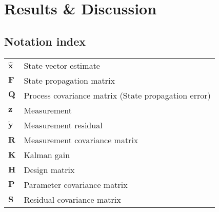 \documentclass[12pt]{article}
\begin{document}
\section{Results \& Discussion}

\newpage
\begin{appendices}

\section{Notation index}
\begin{tabular}{ll}
$\hat{\mathbf{x}}$   & State vector estimate \\
$\mathbf{F}$         & State propagation matrix \\
$\mathbf{Q}$         & Process covariance matrix (State propagation error) \\
$\mathbf{z}$         & Measurement \\
$\tilde{\mathbf{y}}$ & Measurement residual \\
$\mathbf{R}$         & Measurement covariance matrix \\
$\mathbf{K}$         & Kalman gain \\
$\mathbf{H}$         & Design matrix \\
$\mathbf{P}$         & Parameter covariance matrix \\
$\mathbf{S}$         & Residual covariance matrix \\
\end{tabular}

\end{appendices}
\end{document}
